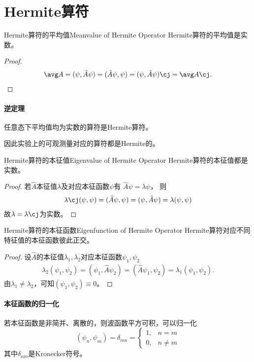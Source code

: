 \section{Hermite算符}
\begin{theorem}{Hermite算符的平均值}{Meanvalue of Hermite Operator}
	Hermite算符的平均值是实数。
	\begin{proof}
		\[
			\avg A=(\psi,\hat A\psi)=(\hat A\psi,\psi)=(\psi,\hat A\psi)\cj=\avg A\cj.\qedhere
		\]
	\end{proof}
	\tcblower
	\paragraph{逆定理}任意态下平均值均为实数的算符是Hermite算符。
\end{theorem}
因此实验上的可观测量对应的算符都是Hermite的。
\begin{theorem}{Hermite算符的本征值}{Eigenvalue of Hermite Operator}
	Hermite算符的本征值都是实数。
	\begin{proof}
		若$\hat A$本征值$\lambda$及对应本征函数$\psi$有
		\(\hat A\psi=\lambda\psi\)，
		则
		\begin{gather*}
			\lambda\cj(\psi,\psi)=(\hat A\psi,\psi)=(\psi,\hat A\psi)=\lambda(\psi,\psi)
		\end{gather*}
		故$\lambda=\lambda\cj$为实数。
	\end{proof}
\end{theorem}
\begin{theorem}{Hermite算符的本征函数}{Eigenfunction of Hermite Operator}
	Hermite算符对应不同特征值的本征函数彼此正交。
	\begin{proof}
		设$\hat A$的本征值$\lambda_1,\lambda_2$对应本征函数$\psi_1,\psi_2$
		\begin{gather*}
			\lambda_2(\psi_1,\psi_2)=(\psi_1,\hat A\psi_2)=(\hat A\psi_1,\psi_2)=\lambda_1(\psi_1,\psi_2).
		\end{gather*}
		由$\lambda_1\neq\lambda_2$，可知$(\psi_1,\psi_2)\equiv 0$。
	\end{proof}
\end{theorem}
\paragraph{本征函数的归一化}若本征函数是非简并、离散的，则波函数平方可积，可以归一化
\[
	(\psi_n,\psi_m)=\delta_{nm}=\begin{cases}
		1, & n=m \\0,&n\neq m
	\end{cases}
\]
其中$\delta_{nm}$是Kronecker符号。

